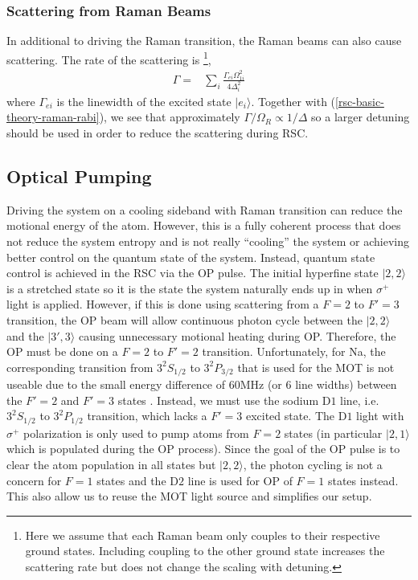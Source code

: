 \subsubsection{Scattering from Raman Beams}
\label{ch:rsc-basic-theory-raman-scatter}

In additional to driving the Raman transition, the Raman beams can also cause scattering.
The rate of the scattering is
\footnote{Here we assume that each Raman beam only couples to their respective ground states.
  Including coupling to the other ground state increases the scattering rate but does not change
  the scaling with detuning.},
\begin{align*}
  \Gamma=&\sum_{i}\frac{\Gamma_{ei}\Omega_{1i}^2}{4\Delta_i^2}
\end{align*}
where $\Gamma_{ei}$ is the linewidth of the excited state $|e_i\rangle$.
Together with (\ref{rsc-basic-theory-raman-rabi}), we see that approximately
$\Gamma/\Omega_R\propto1/\Delta$ so a larger detuning should be used
in order to reduce the scattering during RSC.

\subsection{Optical Pumping}
\label{ch:rsc-basic-theory-op}

Driving the system on a cooling sideband with Raman transition can reduce the
motional energy of the atom. However, this is a fully coherent process that does
not reduce the system entropy and is not really ``cooling'' the system
or achieving better control on the quantum state of the system.
Instead, quantum state control is achieved in the RSC via the OP pulse.
The initial hyperfine state $|2,2\rangle$ is a stretched state so it is the
state the system naturally ends up in when $\sigma^+$ light is applied.
However, if this is done using scattering from a $F=2$ to $F'=3$ transition,
the OP beam will allow continuous photon cycle
between the $|2,2\rangle$ and the $|3',3\rangle$ causing unnecessary motional heating during OP.
Therefore, the OP must be done on a $F=2$ to $F'=2$ transition.
Unfortunately, for Na, the corresponding transition from $3^2S_{1/2}$ to $3^2P_{3/2}$
that is used for the MOT is not useable due to the small energy difference of
$60 \mathrm{MHz}$ (or $6$ line widths) between the $F'=2$ and $F'=3$ states
\cite{steck_sodium_nodate}.
Instead, we must use the sodium $\mathrm{D1}$ line, i.e. $3^2S_{1/2}$ to $3^2P_{1/2}$ transition,
which lacks a $F'=3$ excited state.
The $\mathrm{D1}$ light with $\sigma^+$ polarization is only used to pump atoms from
$F=2$ states (in particular $|2,1\rangle$ which is populated during the OP process).
Since the goal of the OP pulse is to clear the atom population in all states but $|2,2\rangle$,
the photon cycling is not a concern for $F=1$ states and the $\mathrm{D2}$ line
is used for OP of $F=1$ states instead.
This also allow us to reuse the MOT light source and simplifies our setup.

